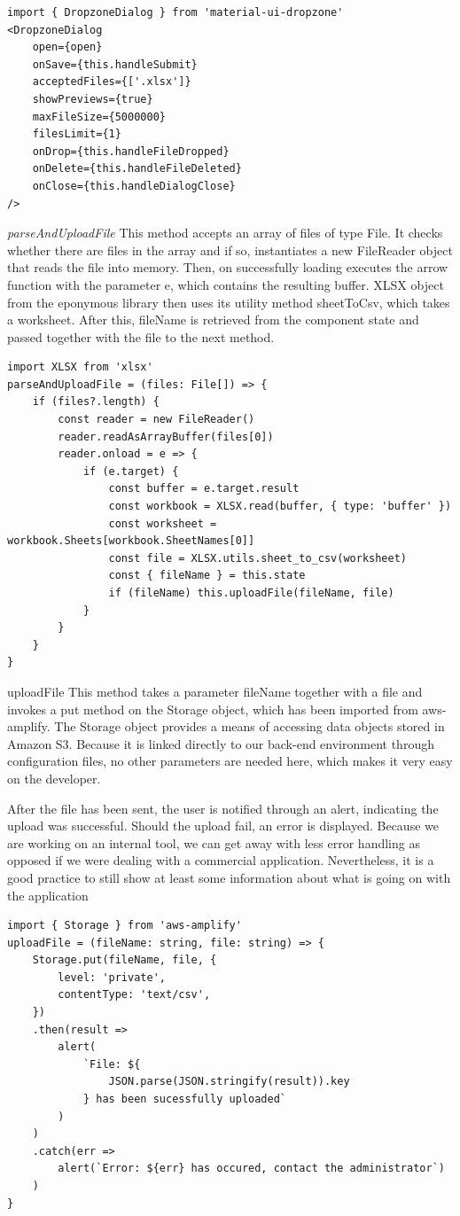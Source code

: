 \documentclass[12pt,oneside]{fithesis2}
\begin{document}
\begin{lstlisting}[style=htmlcssjs]
import { DropzoneDialog } from 'material-ui-dropzone'
<DropzoneDialog
	open={open}
	onSave={this.handleSubmit}
	acceptedFiles={['.xlsx']}
	showPreviews={true}
	maxFileSize={5000000}
	filesLimit={1}
	onDrop={this.handleFileDropped}
	onDelete={this.handleFileDeleted}
	onClose={this.handleDialogClose}
/>
\end{lstlisting}

\textit{\large{parseAndUploadFile}} This method accepts an array of files of type File. It checks whether there are files in the array and if so, instantiates a new FileReader object that reads the file into memory. Then, on successfully loading executes the arrow function with the parameter e, which contains the resulting buffer. XLSX object from the eponymous library then uses its utility method sheetToCsv, which takes a worksheet. After this, fileName is retrieved from the component state and passed together with the file to the next method.

\begin{lstlisting}[style=htmlcssjs]
import XLSX from 'xlsx'
parseAndUploadFile = (files: File[]) => {
	if (files?.length) {
		const reader = new FileReader()
		reader.readAsArrayBuffer(files[0])
		reader.onload = e => {
			if (e.target) {
				const buffer = e.target.result
				const workbook = XLSX.read(buffer, { type: 'buffer' })
				const worksheet = workbook.Sheets[workbook.SheetNames[0]]
				const file = XLSX.utils.sheet_to_csv(worksheet)
				const { fileName } = this.state
				if (fileName) this.uploadFile(fileName, file)
			}
		}
	}
}
\end{lstlisting}

uploadFile This method takes a parameter fileName together with a file and invokes a put method on the Storage object, which has been imported from aws-amplify. The Storage object provides a means of accessing data objects stored in Amazon S3. Because it is linked directly to our back-end environment through configuration files, no other parameters are needed here, which makes it very easy on the developer.

After the file has been sent, the user is notified through an alert, indicating the upload was successful. Should the upload fail, an error is displayed. Because we are working on an internal tool, we can get away with less error handling as opposed if we were dealing with a commercial application. Nevertheless, it is a good practice to still show at least some information about what is going on with the application
\begin{lstlisting}[style=htmlcssjs]
import { Storage } from 'aws-amplify'
uploadFile = (fileName: string, file: string) => {
	Storage.put(fileName, file, {
		level: 'private',
		contentType: 'text/csv',
    })
	.then(result =>
		alert(
			`File: ${
				JSON.parse(JSON.stringify(result)).key
			} has been sucessfully uploaded`
		)
	)
	.catch(err =>
		alert(`Error: ${err} has occured, contact the administrator`)
	)
}
\end{lstlisting}
\end{document}
